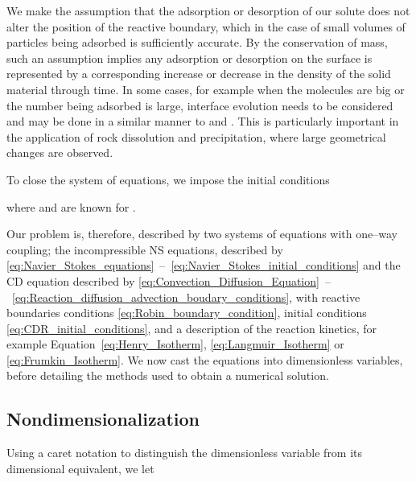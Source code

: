 \documentclass[preprint, 1p, authoryear]{elsarticle}
\begin{document}
We make the assumption that the adsorption or desorption of our solute does not alter the position of the reactive boundary, which in the case of small volumes of particles being adsorbed is sufficiently accurate. By the conservation of mass,
such an assumption implies any adsorption or desorption on the surface is represented by a
corresponding increase or decrease in the density of the solid material through time. In some cases, for example when the molecules are big or the number being adsorbed is large, interface evolution needs to be considered and may be done in a similar manner to \citet{Tartakovsky2008Hybrid,Roubinet2013Hybrid} and \citet{Boso2013Homogenizability}. This is particularly important in the application of rock dissolution and precipitation, where large geometrical changes are observed. 


To close the system of equations, we impose the initial conditions 

where  and  are known for  .  


Our problem is, therefore, described by two systems of equations with one--way coupling; the incompressible NS equations, described by \eqref{eq:Navier_Stokes_equations}~--~\eqref{eq:Navier_Stokes_initial_conditions} and the CD equation described by \eqref{eq:Convection_Diffusion_Equation}~--~\eqref{eq:Reaction_diffusion_advection_boudary_conditions},  with reactive boundaries conditions  \eqref{eq:Robin_boundary_condition},  initial conditions \eqref{eq:CDR_initial_conditions}, and a  description of the reaction kinetics, for example Equation~\eqref{eq:Henry_Isotherm}, \eqref{eq:Langmuir_Isotherm} or \eqref{eq:Frumkin_Isotherm}.  We now cast  the equations into dimensionless variables, before detailing the methods used to obtain a numerical solution. 

\subsection{Nondimensionalization}
\label{sec:nondimensionalisation}
 Using a caret notation to distinguish the dimensionless variable from its dimensional equivalent, we let 
\end{document}
